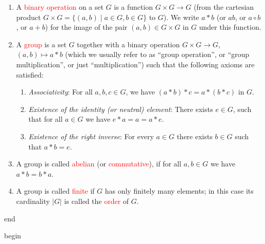 \documentclass[
  12pt,
  a4paper,
  twoside]{article}
\theoremstyle{plain}
\theoremstyle{definition}
\begin{document}
\begin{enumerate}
\def\labelenumi{(\alph{enumi})}
\item
  A \textcolor{red}{binary operation} on a set \(G\) is a function \(G\times G\to G\) (from the cartesian product \(G\times G=\{(a,b)\mid a\in G, b\in G\}\) to \(G\)). We write \(a * b\) (or \(ab\), or \(a\circ b\), or \(a+b\)) for the image of the pair \((a,b)\in G\times G\) in \(G\) under this function.
\item
  A \textcolor{red}{group} is a set \(G\) together with a binary operation \(G\times G\to G\), \((a,b)\mapsto a*b\) (which we usually refer to as ``group operation'', or ``group multiplication'', or just ``multiplication'') such that the following axioms are satisfied:

  \begin{enumerate}
  \def\labelenumii{(\roman{enumii})}
  \item
    \emph{Associativity}: For all \(a,b,c\in G\), we have \((a*b)*c = a*(b*c)\) in \(G\).
  \item
    \emph{Existence of the identity (or neutral) element}: There exists \(e\in G\), such that for all \(a\in G\) we have \(e*a=a=a*e\).
  \item
    \emph{Existence of the right inverse}: For every \(a\in G\) there exists \(b\in G\) such that \(a*b=e\).
  \end{enumerate}
\item
  A group is called \textcolor{red}{abelian} (or \textcolor{red}{commutative}), if for all \(a,b\in G\) we have \(a*b=b*a\).
\item
  A group is called \textcolor{red}{finite} if \(G\) has only finitely many elements; in this case its cardinality \(|G|\) is called the \textcolor{red}{order} of \(G\).
\end{enumerate}

\csname end

\csname begin\label{cnj:expl-groups}
\end{document}

